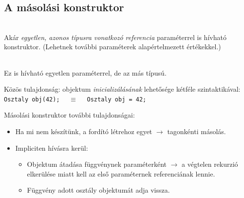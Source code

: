 \documentclass[usenames,dvipsnames,aspectratio=169]{beamer}
\begin{document}
\subsection{A másolási konstruktor}

\begin{frame}
    \begin{description}[m]
        \item[Másolási konstruktor (copy constructor):] \hfill \\ Akár \emph{egyetlen, azonos típusra vonatkozó referencia} paraméterrel is hívható konstruktor. (Lehetnek további paraméterek alapértelmezett értékekkel.)
        \item[Konverziós konstruktor (conversion constructor):] \hfill \\ Ez is hívható egyetlen paraméterrel, de az más típusú.
    \end{description}
    \vfill
    Közös tulajdonság: objektum \emph{inicializálásának} lehetősége kétféle szintaktikával: \\
    \texttt{Osztaly obj(42);} $\quad\equiv\quad$ \texttt{Osztaly obj = 42;} 
\end{frame}

\begin{frame}
    Másolási konstruktor további tulajdonságai:
    \begin{itemize}
        \item Ha mi nem készítünk, a fordító létrehoz egyet $\to$ tagonkénti másolás.
        \item Impliciten hívásra kerül:
            \begin{itemize}
                \item Objektum átadása függvénynek paraméterként $\to$ a végtelen rekurzió elkerülése miatt kell az első paraméternek referenciának lennie.
                \item Függvény adott osztály objektumát adja vissza.
            \end{itemize}
    \end{itemize}
\end{frame}

\begin{frame}
    \begin{exampleblock}{}
        \scriptsize
        
    \end{exampleblock}
\end{frame}
\end{document}
